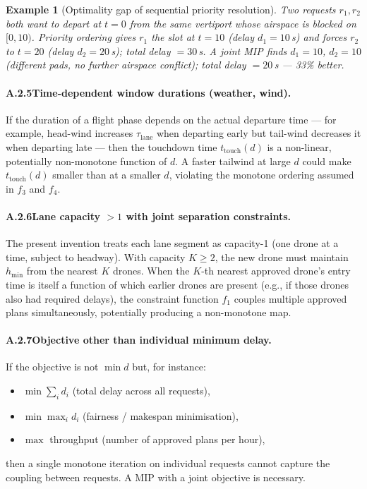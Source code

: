 \documentclass[12pt,a4paper]{article}
\newtheorem{example}{Example}
\newcommand{\ttouch}{t_{\mathrm{touch}}}
\newcommand{\lane}{\tau_{\mathrm{lane}}}
\begin{document}
\begin{example}[Optimality gap of sequential priority resolution]
Two requests $r_1, r_2$ both want to depart at $t=0$ from the same
vertiport whose airspace is blocked on $[0,10)$.
Priority ordering gives $r_1$ the slot at $t=10$ (delay $d_1=10$\,s)
and forces $r_2$ to $t=20$ (delay $d_2=20$\,s); total delay $=30$\,s.
A joint MIP finds $d_1=10$, $d_2=10$ (different pads, no further
airspace conflict); total delay $=20$\,s — 33\% better.
\end{example}

\paragraph{A.2.5\quad Time-dependent window durations (weather, wind).}
If the duration of a flight phase depends on the actual departure time
— for example, head-wind increases $\lane$ when departing early but
tail-wind decreases it when departing late — then the touchdown time
$\ttouch(d)$ is a non-linear, potentially non-monotone function of $d$.
A faster tailwind at large $d$ could make $\ttouch(d)$ smaller than at
a smaller $d$, violating the monotone ordering assumed in $f_3$ and
$f_4$.

\paragraph{A.2.6\quad Lane capacity $> 1$ with joint separation constraints.}
The present invention treats each lane segment as capacity-1 (one drone
at a time, subject to headway).  With capacity $K \ge 2$, the
new drone must maintain $h_{\min}$ from the nearest $K$ drones.
When the $K$-th nearest approved drone's entry time is itself a function
of which earlier drones are present (e.g., if those drones also had
required delays), the constraint function $f_1$ couples multiple
approved plans simultaneously, potentially producing a non-monotone
map.

\paragraph{A.2.7\quad Objective other than individual minimum delay.}
If the objective is not $\min d$ but, for instance:
\begin{itemize}
  \item $\min \sum_i d_i$ (total delay across all requests),
  \item $\min \max_i d_i$ (fairness / makespan minimisation),
  \item $\max$ throughput (number of approved plans per hour),
\end{itemize}
then a single monotone iteration on individual requests cannot capture
the coupling between requests.  A MIP with a joint objective is
necessary.
\end{document}

